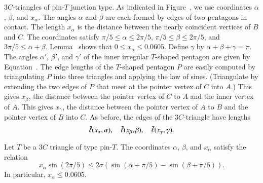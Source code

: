 $3C$-triangles of pin-$T$ junction type.  As indicated in
Figure~, we use coordinates $\alpha$, $\beta$, and
$x_\alpha$.  The angles $\alpha$ and $\beta$ are each formed by edges
of two pentagons in contact.  The length $x_\alpha$ is the distance
between the nearly coincident vertices of $B$ and $C$.
The coordinates satisfy $\pi/5 \le \alpha \le 2\pi/5$, $\pi/5\le
\beta \le 2\pi/5$, and $3\pi/5 \le \alpha+\beta$.
Lemma~ shows that $0\le x_\alpha\le 0.0605$.  Define
$\gamma$ by $\alpha+\beta+\gamma = \pi$.  The angles $\alpha'$,
$\beta'$, and $\gamma'$ of the inner irregular $T$-shaped pentagon are
given by Equation~.  The edge lengths of the $T$-shaped
pentagon $P$ are easily computed by triangulating $P$ into three
triangles and applying the law of sines.  (Triangulate by extending
the two edges of $P$ that meet at the pointer vertex of $C$ into $A$.)
This gives $x_\beta$, the distance between the pointer vertex of $C$
to $A$ and the inner vertex of $A$.  This gives $x_\gamma$, the
distance between the pointer vertex of $A$ to $B$ and the pointer
vertex of $B$ into $C$.  As before, the edges of the $3C$-triangle
have lengths
\[
\bar\ell(x_\alpha,\alpha),\quad \bar\ell(x_\beta,\beta),\quad \bar\ell(x_\gamma,\gamma).
\]



\begin{lemma}
  Let $T$ be a $3C$ triangle of type pin-$T$.  The coordinates
  $\alpha$, $\beta$, and $x_\alpha$ satisfy the relation
\[
x_\alpha \sin(2\pi/5) \le 2\sigma (\sin(\alpha+\pi/5) - \sin(\beta+\pi/5)).
\]
In particular, $x_\alpha \le 0.0605$.
\end{lemma}

